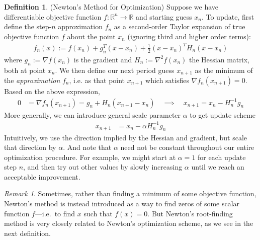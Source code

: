 \documentclass[12pt]{book}
\numberwithin{equation}{section} %
\theoremstyle{plain}
\theoremstyle{definition}
\newtheorem{defn}[thm]{Definition}
\theoremstyle{remark}
\newtheorem*{rmk}{Remark}
\newcommand{\ra}{\rightarrow}
\newcommand{\R}{\mathbb{R}}
\newcommand{\Rn}{\mathbb{R}^n}
\begin{document}
\begin{defn}(Newton's Method for Optimization)
\label{defn:newton}
Suppose we have differentiable objective function $f:\Rn\ra\R$ and
starting guess $x_n$.  To update, first define the step-$n$
approximation $f_n$ as a second-order Taylor expansion of true objective
function $f$ about the point $x_n$ (ignoring third and higher order
terms):
\begin{align}
  f_n(x)
  :=
  f(x_n)
  + g_n^T (x-x_n)
  + \frac{1}{2}(x-x_n)^T H_n(x-x_n)
  \label{eq:newtonapprox}
\end{align}
where $g_n:=\nabla f(x_n)$ is the gradient and $H_n:=\nabla^2 f(x_n)$
the Hessian matrix, both at point $x_n$.
We then define our next period guess $x_{n+1}$ as the minimum of the
\emph{approximation} $f_n$, i.e. as that point $x_{n+1}$ which satisfies
$\nabla f_n(x_{n+1})=0$. Based on the above expression,
\begin{align}
  0 &= \nabla f_n(x_{n+1})
  = g_n + H_n(x_{n+1}-x_n)
  \quad\implies\quad
  x_{n+1}
  =
  x_n-H_n^{-1}g_n
  \label{eq:newtonupdate1}
\end{align}
More generally, we can introduce general scale parameter $\alpha$ to get
update scheme
\begin{align}
  x_{n+1} &= x_n - \alpha H_n^{-1} g_n \label{eq:newtonupdate2}
\end{align}
Intuitively, we use the direction implied by the Hessian and
gradient, but scale that direction by $\alpha$.
And note that $\alpha$ need not be constant throughout our entire
optimization procedure.
For example, we might start at $\alpha=1$ for each update step $n$, and
then try out other values by slowly increasing $\alpha$ until we reach
an acceptable improvement.
\end{defn}

\begin{rmk}
Sometimes, rather than finding a minimum of some objective function,
Newton's method is instead introduced as a way to find zeros of some
scalar function $f$---i.e.\ to find $x$ such that $f(x)=0$.
But Newton's root-finding method is very closely related to Newton's
optimization scheme, as we see in the next definition.
\end{rmk}
\end{document}
